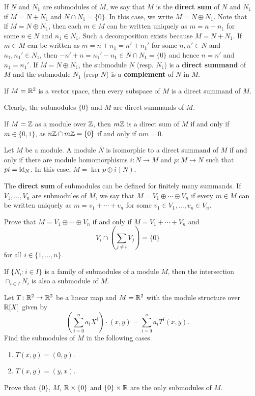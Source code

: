 If $N$ and $N_1$ are submodules of $M$, we say that $M$ is the \textbf{direct sum} of $N$ and $N_1$
if $M=N+N_1$ and $N\cap N_1=\{0\}$. In this case, we write $M=N\oplus N_1$. Note that if
$M=N\oplus N_1$, then each $m\in M$ can be written uniquely as $m=n+n_1$ for some
 $n\in N$ and $n_1\in N_1$. 
Such a decomposition exists because $M=N+N_1$. If $m\in M$ can be written as 
$m=n+n_1=n'+n_1'$ for some $n,n'\in N$ and $n_1,n_1'\in N_1$, then 
$-n'+n=n_1'-n_1\in N\cap N_1=\{0\}$ and hence $n=n'$ and $n_1=n_1'$. If $M=N\oplus N_1$, the submodule
$N$ (resp. $N_1$) is a \textbf{direct summand} of $M$ and the submodule $N_1$ (resp $N$) is a \textbf{complement} of $N$ 
in $M$.   	

\begin{example}
If $M=\mathbb{R}^2$ is a vector space, then every subspace of $M$ is a direct summand of $M$.
\end{example}

Clearly, the submodules $\{0\}$ and $M$ are direct summands of $M$.

\begin{example}
If $M=\mathbb{Z}$ as a module over $\mathbb{Z}$, then $m\mathbb{Z}$ is a direct sum of $M$ if and only if 
$m\in\{0,1\}$, as $n\mathbb{Z}\cap m\mathbb{Z}=\{0\}$ if and only if $nm=0$.
\end{example}

\begin{exercise}
\label{xca:projector}
Let $M$ be a module. 
A module $N$ is isomorphic to a direct summand of $M$ if and only if
there are module homomorphisms $i\colon N\to M$ and $p\colon M\to N$ 
such that $pi=\operatorname{id}_N$. In this case, $M=\ker p\oplus i(N)$.  
\end{exercise}

The \textbf{direct sum} of submodules can be defined for finitely many summands. 
If $V_1,\dots,V_n$ are submodules of $M$, we say that $M=V_1\oplus\cdots\oplus V_n$ 
if every $m\in M$ can be written uniquely as $m=v_1+\cdots+v_n$ for some $v_1\in V_1,\dots,v_n\in V_n$. 

\begin{exercise}
Prove that $M=V_1\oplus\cdots\oplus V_n$ if and only if 
$M=V_1+\cdots+V_n$ and 
\[
V_i\cap\left(\sum_{j\ne i}V_j\right)=\{0\}
\]	
for all $i\in\{1,\dots,n\}$.
\end{exercise}

If $\{N_i:i\in I\}$ is a family of submodules of a module $M$, then the intersection  
$\cap_{i\in I}N_i$ is also a submodule of $M$.

\begin{exercise}
\label{xca:submodules}
Let $T\colon\mathbb{R}^2\to\mathbb{R}^2$ be a linear map and $M=\mathbb{R}^2$ with the module structure 
over $\mathbb{R}[X]$ given by
\[
\left(\sum_{i=0}^n a_iX^i\right)\cdot (x,y)=\sum_{i=0}^n a_iT^i(x,y).
\]
Find the submodules of $M$ in the following cases. 
\begin{enumerate}
    \item $T(x,y)=(0,y)$.
    \item $T(x,y)=(y,x)$.
\end{enumerate}
Prove that 
$\{0\}$, $M$, $\mathbb{R}\times\{0\}$ and $\{0\}\times\mathbb{R}$ 
are the only submodules of $M$.
\end{exercise}

